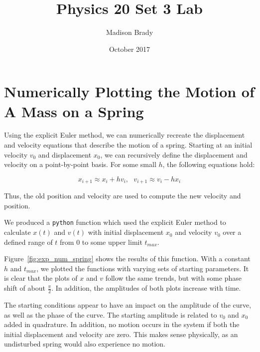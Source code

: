 \documentclass{article}
\title{Physics 20 Set 3 Lab}
\author{Madison Brady}
\date{October 2017}
\begin{document}
\maketitle

\section{Numerically Plotting the Motion of A Mass on a Spring}

Using the explicit Euler method, we can numerically recreate the displacement and velocity equations that describe the motion of a spring.  Starting at an initial velocity $v_0$ and displacement $x_0$, we can recursively define the displacement and velocity on a point-by-point basis.  For some small $h$, the following equations hold:

\begin{equation}
    x_{i + 1} \approx x_i + h v_i, ~~~
    v_{i + 1} \approx v_i - h x_i
\end{equation}

Thus, the old position and velocity are used to compute the new velocity and position.

We produced a \texttt{python} function which used the explicit Euler method to calculate $x(t)$ and $v(t)$ with initial displacement $x_0$ and velocity $v_0$ over a defined range of $t$ from $0$ to some upper limit $t_{max}$.

Figure~\ref{fig:exp_num_spring} shows the results of this function.  With a constant $h$ and $t_{max}$, we plotted the functions with varying sets of starting parameters.  It is clear that the plots of $x$ and $v$ follow the same trends, but with some phase shift of about $\frac{\pi}{2}$.  In addition, the amplitudes of both plots increase with time.

The starting conditions appear to have an impact on the amplitude of the curve, as well as the phase of the curve.  The starting amplitude is related to $v_0$ and $x_0$ added in quadrature.  In addition, no motion occurs in the system if both the initial displacement and velocity are zero.  This makes sense physically, as an undisturbed spring would also experience no motion.
\end{document}
